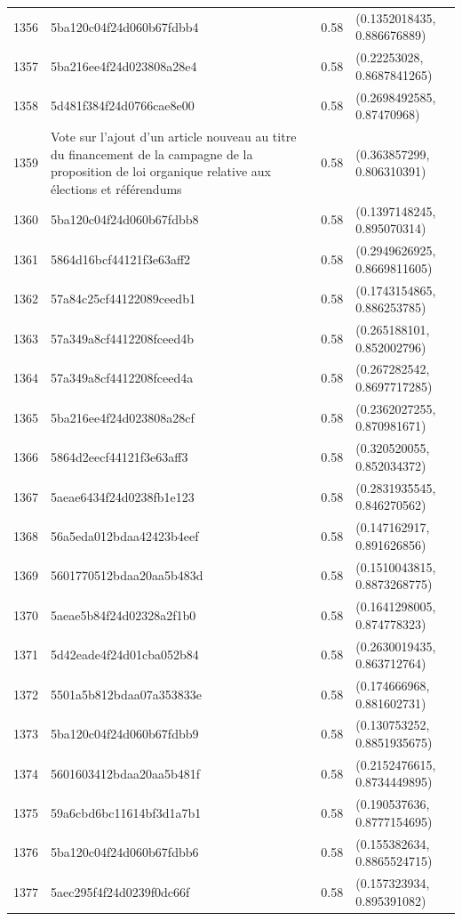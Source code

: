 \begin{table}[ht]
\begin{tabular}{rlrl}
  1356 & 5ba120c04f24d060b67fdbb4 & 0.58 & (0.1352018435, 0.886676889) \\ 
  1357 & 5ba216ee4f24d023808a28e4 & 0.58 & (0.22253028, 0.8687841265) \\ 
  1358 & 5d481f384f24d0766cae8e00 & 0.58 & (0.2698492585, 0.87470968) \\ 
  1359 & Vote sur l'ajout d'un article nouveau au titre du financement de la campagne de la proposition de loi organique relative aux élections et référendums & 0.58 & (0.363857299, 0.806310391) \\ 
  1360 & 5ba120c04f24d060b67fdbb8 & 0.58 & (0.1397148245, 0.895070314) \\ 
  1361 & 5864d16bcf44121f3e63aff2 & 0.58 & (0.2949626925, 0.8669811605) \\ 
  1362 & 57a84c25cf44122089ceedb1 & 0.58 & (0.1743154865, 0.886253785) \\ 
  1363 & 57a349a8cf4412208fceed4b & 0.58 & (0.265188101, 0.852002796) \\ 
  1364 & 57a349a8cf4412208fceed4a & 0.58 & (0.267282542, 0.8697717285) \\ 
  1365 & 5ba216ee4f24d023808a28cf & 0.58 & (0.2362027255, 0.870981671) \\ 
  1366 & 5864d2eecf44121f3e63aff3 & 0.58 & (0.320520055, 0.852034372) \\ 
  1367 & 5aeae6434f24d0238fb1e123 & 0.58 & (0.2831935545, 0.846270562) \\ 
  1368 & 56a5eda012bdaa42423b4eef & 0.58 & (0.147162917, 0.891626856) \\ 
  1369 & 5601770512bdaa20aa5b483d & 0.58 & (0.1510043815, 0.8873268775) \\ 
  1370 & 5aeae5b84f24d02328a2f1b0 & 0.58 & (0.1641298005, 0.874778323) \\ 
  1371 & 5d42eade4f24d01cba052b84 & 0.58 & (0.2630019435, 0.863712764) \\ 
  1372 & 5501a5b812bdaa07a353833e & 0.58 & (0.174666968, 0.881602731) \\ 
  1373 & 5ba120c04f24d060b67fdbb9 & 0.58 & (0.130753252, 0.8851935675) \\ 
  1374 & 5601603412bdaa20aa5b481f & 0.58 & (0.2152476615, 0.8734449895) \\ 
  1375 & 59a6cbd6bc11614bf3d1a7b1 & 0.58 & (0.190537636, 0.8777154695) \\ 
  1376 & 5ba120c04f24d060b67fdbb6 & 0.58 & (0.155382634, 0.8865524715) \\ 
  1377 & 5aec295f4f24d0239f0dc66f & 0.58 & (0.157323934, 0.895391082) \\ 

\end{tabular}
\end{table}
